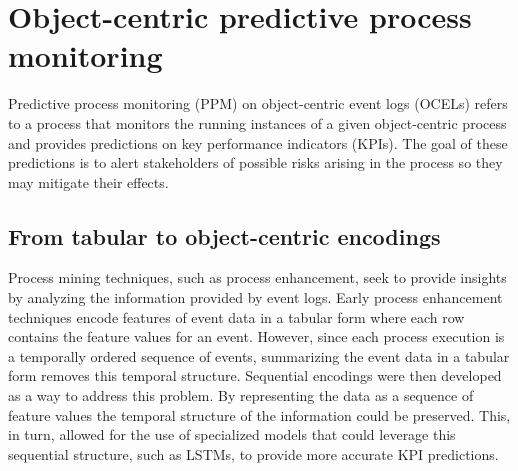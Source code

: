\section{Object-centric predictive process monitoring}
    Predictive process monitoring (PPM) on object-centric event logs (OCELs) refers to a process that monitors the running instances of a given object-centric process and provides predictions on key performance indicators (KPIs). The goal of these predictions is to alert stakeholders of possible risks arising in the process so they may mitigate their effects. 
        
    \subsection{From tabular to object-centric encodings}
        Process mining techniques, such as process enhancement, seek to provide insights by analyzing the information provided by event logs.
        Early process enhancement techniques encode features of event data in a tabular form where each row contains the feature values for an event. However, since each process execution is a temporally ordered sequence of events, summarizing the event data in a tabular form removes this temporal structure.
        Sequential encodings were then developed as a way to address this problem. By representing the data as a sequence of feature values the temporal structure of the information could be preserved. This, in turn, allowed for the use of specialized models that could leverage this sequential structure, such as LSTMs, to provide more accurate KPI predictions.

